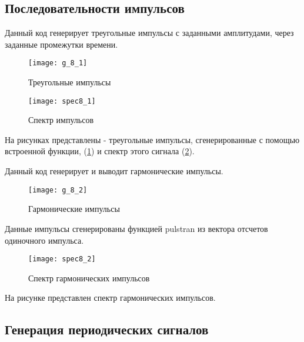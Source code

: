 \subsection{Последовательности импульсов}


\parindent=1cm
Данный код генерирует треугольные импульсы с заданными амплитудами, через заданные промежутки времени.

\begin{figure}[H]
	\begin{center}
		\texttt{[image: g\_8\_1]}
		\caption{Треугольные импульсы} 
		\label{pic:g_8_1} %
	\end{center}
\end{figure}
\begin{figure}[H]
	\begin{center}
		\texttt{[image: spec8\_1]}
		\caption{Спектр импульсов} 
		\label{pic:spec8_1} %
	\end{center}
\end{figure}
На рисунках представлены - треугольные импульсы, сгенерированные с помощью встроенной функции, (\ref{pic:g_8_1}) и спектр этого сигнала (\ref{pic:spec8_1}).


\parindent=1cm
Данный код генерирует и выводит гармонические импульсы.

\begin{figure}[H]
	\begin{center}
		\texttt{[image: g\_8\_2]}
		\caption{Гармонические импульсы} 
		\label{pic:g_8_2} %
	\end{center}
\end{figure}
Данные импульсы сгенерированы функцией pulstran из вектора отсчетов одиночного импульса.
\begin{figure}[H]
	\begin{center}
		\texttt{[image: spec8\_2]}
		\caption{Спектр гармонических импульсов} 
		\label{pic:spec8_2} %
	\end{center}
\end{figure}
На рисунке представлен спектр гармонических импульсов.


\subsection{Генерация периодических сигналов}

